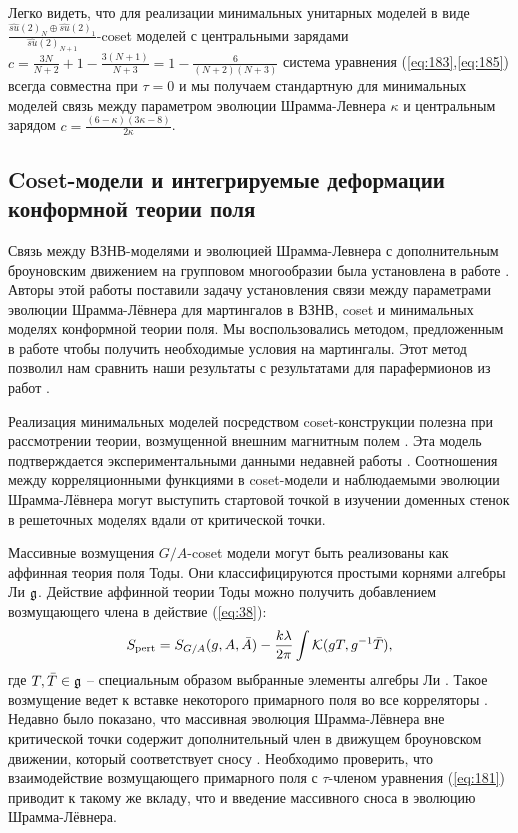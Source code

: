 Легко видеть, что для реализации минимальных унитарных моделей в виде  $\frac{\hat{su}(2)_{N}\oplus \hat{su}(2)_{1}}{\hat{su}(2)_{N+1}}$-coset моделей с центральными зарядами $c=\frac{3N}{N+2}+1-\frac{3(N+1)}{N+3}=1-\frac{6}{(N+2)(N+3)}$ система уравнения (\ref{eq:183},\ref{eq:185}) всегда совместна при  $\tau=0$ и мы получаем стандартную для минимальных моделей связь между параметром эволюции Шрамма-Левнера $\kappa$ и центральным зарядом $c=\frac{(6-\kappa)(3\kappa-8)}{2\kappa}$.

\subsection{Coset-модели и интегрируемые деформации конформной теории поля}
\label{sec:outlook}


Связь между  ВЗНВ-моделями и эволюцией Шрамма-Левнера с дополнительным броуновским движением на групповом многообразии была установлена в работе    \cite{bettelheim2005stochastic}. Авторы этой работы поставили задачу установления связи между параметрами эволюции Шрамма-Лёвнера для мартингалов в ВЗНВ, coset  и минимальных моделях конформной теории поля. Мы воспользовались методом, предложенным в работе \cite{alekseev2010sle} чтобы получить необходимые условия на мартингалы. Этот метод позволил нам сравнить наши результаты с результатами для парафермионов из работ \cite{santachiara2008sle,picco2008numerical}.

Реализация минимальных моделей посредством  coset-конструкции полезна при рассмотрении теории, возмущенной внешним магнитным полем \cite{fateev1990conformal,eguchi1989deformations,hollowood1989rational}. Эта модель подтверждается экспериментальными данными недавней работы \cite{coldea2010quantum}. Соотношения между корреляционными функциями в  coset-модели и наблюдаемыми эволюции Шрамма-Лёвнера могут выступить стартовой точкой в изучении доменных стенок в решеточных моделях вдали от критической точки.

Массивные возмущения  $G/A$-coset модели могут быть реализованы как аффинная теория поля Тоды. Они классифицируются простыми корнями алгебры Ли $\mathfrak{g}$. Действие аффинной теории Тоды можно получить добавлением возмущающего члена в действие (\ref{eq:38}):
\begin{equation}
  S_{\text{pert}}=S_{G/A}(g,A,\bar A)-\frac{k\lambda}{2\pi}\int {\cal K} (g T, g^{-1} \bar T),
\end{equation}
где $T,\bar T\in \mathfrak{g}$ -- специальным образом выбранные элементы алгебры Ли \cite{bakas1996lagrangian,hollowood1995massive,park1994deformed}. Такое возмущение ведет к вставке некоторого примарного поля во все корреляторы \cite{hollowood1989rational}. Недавно было показано, что массивная эволюция Шрамма-Лёвнера вне критической точки содержит дополнительный член в движущем броуновском движении, который соответствует сносу \cite{makarov2010off,bauer2009off}. Необходимо проверить, что взаимодействие возмущающего примарного поля с  $\tau$-членом уравнения (\ref{eq:181}) приводит к такому же вкладу, что и введение массивного сноса в эволюцию Шрамма-Лёвнера.

